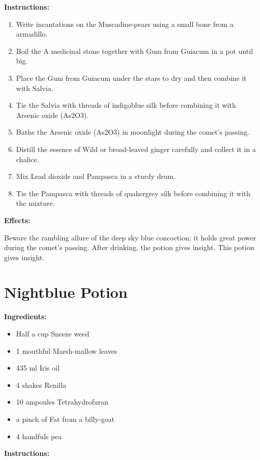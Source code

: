 \documentclass{article}
\begin{document}
\textbf{Instructions:}

\begin{enumerate}
  \item Write incantations on the Muscadine-pears using a small bone from a armadillo.
  \item Boil the A medicinal stone together with Gum from Guiacum in a pot until big.
  \item Place the Gum from Guiacum under the stars to dry and then combine it with Salvia.
  \item Tie the Salvia with threads of indigoblue silk before combining it with Arsenic oxide (As2O3).
  \item Bathe the Arsenic oxide (As2O3) in moonlight during the comet’s passing.
  \item Distill the essence of Wild or broad-leaved ginger carefully and collect it in a chalice.
  \item Mix Lead dioxide and Pampasca in a sturdy drum.
  \item Tie the Pampasca with threads of quakergrey silk before combining it with the mixture.
\end{enumerate}

\textbf{Effects:}

Beware the rambling allure of the deep sky blue concoction; it holds great power during the comet’s passing. After drinking, the potion gives insight. This potion gives insight.

\newpage
\section*{Nightblue Potion}

\textbf{Ingredients:}

\begin{itemize}
  \item Half a cup Sneeze weed
  \item 1 mouthful Marsh-mallow leaves
  \item 435 ml Iris oil
  \item 4 shakes Renilla
  \item 10 ampoules Tetrahydrofuran
  \item a pinch of Fat from a billy-goat
  \item 4 handfuls pea
\end{itemize}

\textbf{Instructions:}
\end{document}
